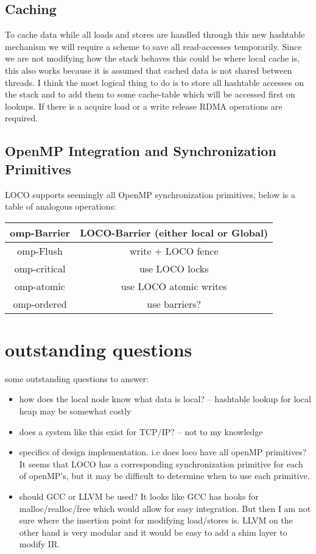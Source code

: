 \documentclass[sigplan,nonacm]{acmart}
\begin{document}
\subsection{Caching}
To cache data while all loads and stores are handled through this new hashtable 
mechanism we will require a scheme to save all read-accesses temporarily. Since 
we are not modifying how the stack behaves this could be where local cache is, this 
also works because it is assumed that cached data is not shared between threads.
I think the most logical thing to do is to store all hashtable accesses on the stack 
and to add them to some cache-table which will be accessed first on lookups. If there 
is a acquire load or a write release RDMA operations are required.

\subsection{OpenMP Integration and Synchronization Primitives}
LOCO supports seemingly all OpenMP synchronization primitives, below is a table of 
analogous operations:

\begin{center}
    \begin{tabular}{ |c|c| } 
     \hline
     omp-Barrier & LOCO-Barrier (either local or Global) \\ 
     \hline
     omp-Flush & write + LOCO fence\\ 
     \hline
     omp-critical & use LOCO locks \\ 
     \hline
     omp-atomic & use LOCO atomic writes \\
     \hline
     omp-ordered & use barriers? \\
     \hline
    \end{tabular}
\end{center}


\section{outstanding questions}
some outstanding questions to answer:
\begin{itemize}
    \item how does the local node know what data is local? -- hashtable lookup for local heap 
    may be somewhat costly
    \item does a system like this exist for TCP/IP? -- not to my knowledge
    \item specifics of design implementation. i.e does loco have all openMP primitives? It 
    seems that LOCO has a corresponding synchronization primitive for each of openMP's, but it 
    may be difficult to determine when to use each primitive.
    \item should GCC or LLVM be used? It looks like GCC has hooks for malloc/realloc/free which 
    would allow for easy integration. But then I am not sure where the insertion point for modifying 
    load/stores is. LLVM on the other hand is very modular and it would be easy to add a shim layer 
    to modify IR. 
\end{itemize}
\end{document}
